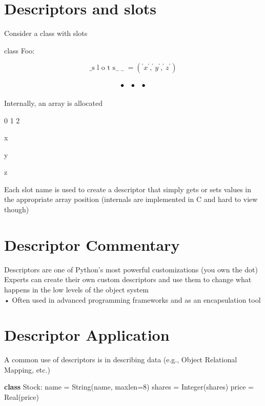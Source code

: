 \documentclass[
  letterpaper,
  DIV=11,
  numbers=noendperiod]{scrreprt}
\newenvironment{Shaded}{\begin{snugshade}}{\end{snugshade}}
\newcommand{\DecValTok}[1]{\textcolor[rgb]{0.68,0.00,0.00}{#1}}
\newcommand{\KeywordTok}[1]{\textcolor[rgb]{0.00,0.23,0.31}{\textbf{#1}}}
\newcommand{\NormalTok}[1]{\textcolor[rgb]{0.00,0.23,0.31}{#1}}
\newcommand{\OperatorTok}[1]{\textcolor[rgb]{0.37,0.37,0.37}{#1}}
\newcommand{\StringTok}[1]{\textcolor[rgb]{0.13,0.47,0.30}{#1}}
\begin{document}

\chapter{Descriptors and slots}\label{descriptors-and-slots}

Consider a class with slots

class Foo:

\[
\_ \text {s l o t s} _ {- - } = \left(^ {\prime} x ^ {\prime}, ^ {\prime} y ^ {\prime}, ^ {\prime} z ^ {\prime}\right)
\]

\[
\begin{array}{c c c} \bullet & \bullet & \bullet \end{array}
\]

Internally, an array is allocated

0 1 2

x

y

z

Each slot name is used to create a descriptor that simply gets or sets
values in the appropriate array position (internals are implemented in C
and hard to view though)


\chapter{Descriptor Commentary}\label{descriptor-commentary}

Descriptors are one of Python's most powerful customizations (you own
the dot)\\
Experts can create their own custom descriptors and use them to change
what happens in the low levels of the object system\\
• Often used in advanced programming frameworks and as an encapsulation
tool


\chapter{Descriptor Application}\label{descriptor-application}

A common use of descriptors is in describing data (e.g., Object
Relational Mapping, etc.)

\begin{Shaded}
\begin{Highlighting}[]
\KeywordTok{class}\NormalTok{ Stock:  }
\NormalTok{    name }\OperatorTok{=}\NormalTok{ String(}\StringTok{\textquotesingle{}name\textquotesingle{}}\NormalTok{, maxlen}\OperatorTok{=}\DecValTok{8}\NormalTok{)  }
\NormalTok{    shares }\OperatorTok{=}\NormalTok{ Integer(}\StringTok{\textquotesingle{}shares\textquotesingle{}}\NormalTok{)  }
\NormalTok{    price }\OperatorTok{=}\NormalTok{ Real(}\StringTok{\textquotesingle{}price\textquotesingle{}}\NormalTok{) }
\end{Highlighting}
\end{Shaded}
\end{document}
